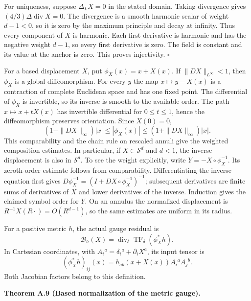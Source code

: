 \documentclass[
  english,
  11pt,
  reqno]{amsart}
\makeatletter
\newcommand{\pandocstatementheading}[1]{%
  \par\if@nobreak\else
    \addpenalty{\@beginparpenalty}%
    \addvspace{.5\baselineskip plus .2\baselineskip minus .2\baselineskip}%
  \fi
  {\normalfont\bfseries #1\par}%
  \nobreak\@afterindenttrue\@afterheading
}
\makeatother
\begin{document}
For uniqueness, suppose \(\Delta_LX=0\) in the stated domain. Taking
divergence gives \((4/3)\Delta\operatorname{div}X=0\). The divergence is
a smooth harmonic scalar of weight \(d-1<0\), so it is zero by the
maximum principle and decay at infinity. Thus every component of \(X\)
is harmonic. Each first derivative is harmonic and has the negative
weight \(d-1\), so every first derivative is zero. The field is constant
and its value at the anchor is zero. This proves injectivity.
\hfill\(\square\)

For a based displacement \(X\), put \(\phi_X(x)=x+X(x)\). If
\(\|DX\|_{L^\infty}<1\), then \(\phi_X\) is a global diffeomorphism. For
every \(y\) the map \(x\mapsto y-X(x)\) is a contraction of complete
Euclidean space and has one fixed point. The differential of \(\phi_X\)
is invertible, so its inverse is smooth to the available order. The path
\(x\mapsto x+tX(x)\) has invertible differential for \(0\le t\le1\),
hence the diffeomorphism preserves orientation. Since \(X(0)=0\),%
 \[
(1-\|DX\|_\infty)|x|
\le|\phi_X(x)|
\le(1+\|DX\|_\infty)|x|.
\] This comparability and the chain rule on rescaled annuli give the
weighted composition estimates. In particular, if \(X\in\mathscr S^d\)
and \(d<1\), the inverse displacement is also in \(\mathscr S^d\). To
see the weight explicitly, write \(Y=-X\circ\phi_X^{-1}\). Its
zeroth-order estimate follows from comparability. Differentiating the
inverse equation first gives
\(D\phi_X^{-1}=(I+DX\circ\phi_X^{-1})^{-1}\); subsequent derivatives are
finite sums of derivatives of \(X\) and lower derivatives of the
inverse. Induction gives the claimed symbol order for \(Y\). On an
annulus the normalized displacement is \(R^{-1}X(R\cdot)=O(R^{d-1})\),
so the same estimates are uniform in its radius.

For a positive metric \(h\), the actual gauge residual is%
 \[
\mathcal B_h(X)
=\operatorname{div}_\delta\operatorname{TF}_\delta(\phi_X^*h).
\] In Cartesian coordinates, with
\(A_i{}^a=\delta_i{}^a+\partial_iX^a\), its input tensor is%
 \[
(\phi_X^*h)_{ij}(x)
=h_{ab}(x+X(x))A_i{}^aA_j{}^b.
\] Both Jacobian factors belong to this definition.

\pandocstatementheading{\leavevmode{}\label{thm:online-gauge-based-normalization}Theorem A.9 (Based normalization of the metric gauge).}
\end{document}
